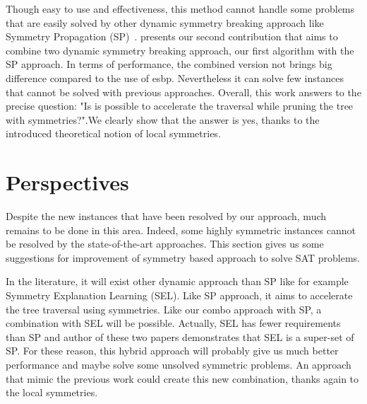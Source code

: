 Though easy to use and effectiveness, this method cannot handle some problems that are easily solved by other
dynamic symmetry breaking approach like Symmetry Propagation (SP)~\cite{Devriendt12}.
 presents our second contribution that aims to combine two dynamic symmetry breaking approach, our first algorithm  with the SP approach. In terms of performance, the combined version not brings big difference
compared to the use of esbp. Nevertheless it can solve few instances that cannot be solved with previous approaches.
Overall,  this  work  answers  to  the  precise  question: "Is is possible to accelerate the traversal while pruning the tree
with symmetries?".We clearly show that the answer is yes, thanks to the introduced theoretical notion of local symmetries.


%
%
%
%
%
%
%
%
%

\section{Perspectives}

Despite the new instances that have been resolved by our approach, much remains to be done in this area.
Indeed, some highly symmetric instances cannot be resolved by the state-of-the-art approaches.
This section gives us some suggestions for improvement of symmetry based approach to solve SAT problems.

In the literature, it will exist other dynamic approach than SP like for example Symmetry Explanation Learning (SEL)\cite{devriendt2017symmetric}. Like SP approach, it aims to accelerate the tree traversal using symmetries.
Like our combo approach with SP, a combination with SEL will be possible.
Actually, SEL has fewer requirements than SP and author of these two papers demonstrates that
SEL is a super-set of SP. For these reason, this hybrid approach will probably give us much better performance and 
maybe solve some unsolved symmetric problems.
An approach that mimic the previous work could create this new combination, thanks again to the local symmetries.

